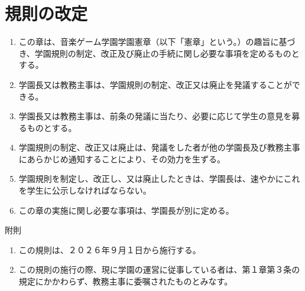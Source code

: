 \newpage
\chapter{規則の改定}
\begin{enumerate}[label=第\arabic*条　]
  \item この章は、音楽ゲーム学園学園憲章（以下「憲章」という。）の趣旨に基づき、学園規則の制定、改正及び廃止の手続に関し必要な事項を定めるものとする。
  \item 学園長又は教務主事は、学園規則の制定、改正又は廃止を発議することができる。
  \item 学園長又は教務主事は、前条の発議に当たり、必要に応じて学生の意見を募るものとする。
  \item 学園規則の制定、改正又は廃止は、発議をした者が他の学園長及び教務主事にあらかじめ通知することにより、その効力を生ずる。
  \item 学園規則を制定し、改正し、又は廃止したときは、学園長は、速やかにこれを学生に公示しなければならない。
  \item この章の実施に関し必要な事項は、学園長が別に定める。
\end{enumerate}

\bigskip
\noindent 附則

\begin{enumerate}[label=\arabic*　,leftmargin=*]
  \item この規則は、２０２６年９月１日から施行する。
  \item この規則の施行の際、現に学園の運営に従事している者は、第１章第３条の規定にかかわらず、教務主事に委嘱されたものとみなす。
\end{enumerate}